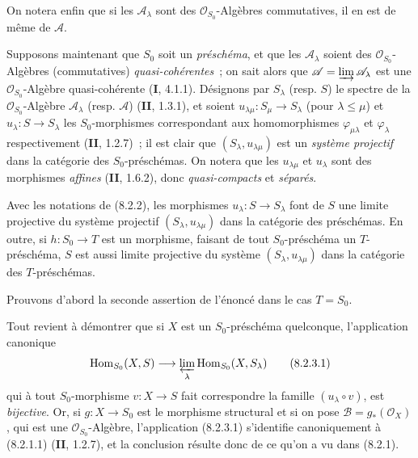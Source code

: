 \begin{env}[8.2.1]
On notera enfin que si les $\mathscr A_\lambda$ sont des
$\mathcal O_{S_0}$-Algèbres commutatives, il en est de même de $\mathscr A$.
\end{env}

\begin{env}[8.2.2]
\label{IV.8.2.2-fr}
Supposons maintenant que $S_0$ soit un \emph{préschéma}, et que les
$\mathscr A_\lambda$ soient des $\mathcal O_{S_0}$-Algèbres (commutatives)
\emph{quasi-cohérentes}~; on sait alors que
$\mathscr A=\varinjlim\mathscr A_\lambda$ est une
$\mathcal O_{S_0}$-Algèbre quasi-cohérente (\textbf{I}, 4.1.1). Désignons par
$S_\lambda$ (resp. $S$) le spectre de la $\mathcal O_{S_0}$-Algèbre
$\mathscr A_\lambda$ (resp. $\mathscr A$) (\textbf{II}, 1.3.1), et soient
$u_{\lambda\mu}:S_\mu\to S_\lambda$ (pour $\lambda\leq\mu$) et
$u_\lambda:S\to S_\lambda$ les $S_0$-morphismes correspondant aux
homomorphismes $\varphi_{\mu\lambda}$ et $\varphi_\lambda$ respectivement
(\textbf{II}, 1.2.7)~; il est clair que $(S_\lambda,u_{\lambda\mu})$ est un
\emph{système projectif} dans la catégorie des $S_0$-préschémas. On notera
que les $u_{\lambda\mu}$ et $u_\lambda$ sont des morphismes \emph{affines}
(\textbf{II}, 1.6.2), donc \emph{quasi-compacts} et \emph{séparés}.
\end{env}

\begin{proposition}[8.2.3]
\label{IV.8.2.3-fr}
Avec les notations de \textup{(8.2.2)}, les morphismes $u_\lambda:S\to S_\lambda$
font de $S$ une limite projective du système projectif
$(S_\lambda,u_{\lambda\mu})$ dans la catégorie des préschémas. En outre, si
$h:S_0\to T$ est un morphisme, faisant de tout $S_0$-préschéma un
$T$-préschéma, $S$ est aussi limite projective du système
$(S_\lambda,u_{\lambda\mu})$ dans la catégorie des $T$-préschémas.
\end{proposition}

Prouvons d'abord la seconde assertion de l'énoncé dans le cas $T=S_0$.

Tout revient à démontrer que si $X$ est un $S_0$-préschéma quelconque,
l'application canonique
\begin{equation}
\operatorname{Hom}_{S_0}(X,S)\longrightarrow
\varprojlim_\lambda\operatorname{Hom}_{S_0}(X,S_\lambda)
\tag{8.2.3.1}\label{IV.8.2.3.1-fr}
\end{equation}
qui à tout $S_0$-morphisme $v:X\to S$ fait correspondre la famille
$(u_\lambda\circ v)$, est \emph{bijective}. Or, si $g:X\to S_0$ est le
morphisme structural et si on pose $\mathscr B=g_*(\mathcal O_X)$, qui est
une $\mathcal O_{S_0}$-Algèbre, l'application (8.2.3.1) s'identifie
canoniquement à (8.2.1.1) (\textbf{II}, 1.2.7), et la conclusion résulte donc de ce
qu'on a vu dans (8.2.1).

